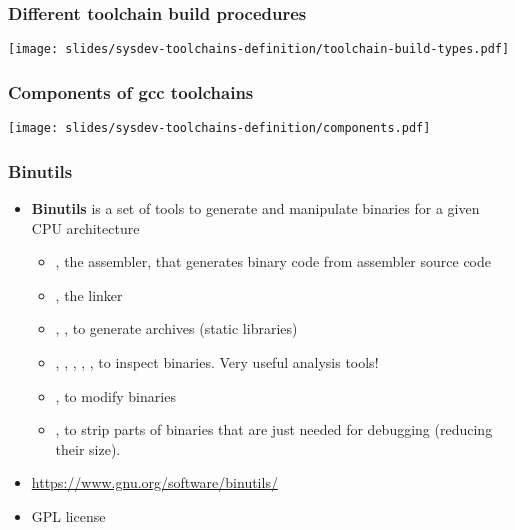 \begin{frame}
  \frametitle{Different toolchain build procedures}
  \begin{center}
    \texttt{[image: slides/sysdev-toolchains-definition/toolchain-build-types.pdf]}
  \end{center}
\end{frame}

\begin{frame}
  \frametitle{Components of gcc toolchains}
  \begin{center}
    \texttt{[image: slides/sysdev-toolchains-definition/components.pdf]}
  \end{center}
\end{frame}

\begin{frame}
  \frametitle{Binutils}
  \begin{itemize}
  \item {\bf Binutils} is a set of tools to generate and manipulate
    binaries for a given CPU architecture
    \begin{itemize}
    \item {}, the assembler, that generates binary code from
      assembler source code
    \item {}, the linker
    \item {}, , to generate  archives
     (static libraries)
    \item {}, , , ,
      , to inspect binaries. Very useful analysis tools!
    \item {}, to modify binaries
    \item {}, to strip parts of binaries that are just needed
      for debugging (reducing their size).
    \end{itemize}
  \item \url{https://www.gnu.org/software/binutils/}
  \item GPL license
  \end{itemize}
\end{frame}

